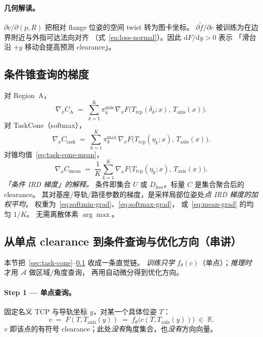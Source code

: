 \documentclass[UTF8,a4paper,11pt,fontset=fandol]{ctexart}
\newcommand{\R}{\mathbb{R}}
\newcommand{\Tcp}{T_{\mathrm{tcp}}}
\newcommand{\Taxis}{T_{\mathrm{axis}}}
\begin{document}
\paragraph{几何解读。}
\(\partial c/\partial(p,R)\) 把相对 flange 位姿的空间 twist 转为图卡坐标。
\(\partial\tilde f/\partial c\) 被训练为在边界附近与外指可达法向对齐
（式~\eqref{eq:loss-normal}）。因此 \(\mathrm{d}F/\mathrm{d}y>0\) 表示
「滑台沿 \(+y\) 移动会提高预测 clearance」。

\subsection{条件锥查询的梯度}
\label{sec:cond-grad}

对 Region~A，
\begin{equation}
\label{eq:grad-region}
  \nabla_{x} C_{\mathrm{A}}
  \;=\;
  \sum_{k=1}^{K}
  \pi_{k}^{\mathrm{min}}\,
  \nabla_{x} F\bigl(\Tcp(\delta_{k};x),\,\Taxis(x)\bigr).
\end{equation}
对 TaskCone（softmax），
\begin{equation}
\label{eq:grad-task}
  \nabla_{x} C_{\mathrm{task}}
  \;=\;
  \sum_{k=1}^{K}
  \pi_{k}^{\mathrm{max}}\,
  \nabla_{x} F\bigl(\Tcp(\eta_{k};x),\,\Taxis(x)\bigr).
\end{equation}
对锥均值~\eqref{eq:task-cone-mean}，
\begin{equation}
\label{eq:grad-mean}
  \nabla_{x} C_{\mathrm{mean}}
  \;=\;
  \frac{1}{K}\sum_{k=1}^{K}
  \nabla_{x} F\bigl(\Tcp(\eta_{k};x),\,\Taxis(x)\bigr).
\end{equation}
\emph{「条件 IRD 梯度」的解释。}
条件即集合 \(U\) 或 \(D_{\mathrm{free}}\)。标量 \(C\) 是集合聚合后的 clearance。
其对基座/导轨/路径参数的梯度，是采样局部位姿处\emph{点 IRD 梯度的加权平均}，
权重为~\eqref{eq:softmin-grad}、\eqref{eq:softmax-grad}，
或~\eqref{eq:mean-grad} 的均匀 \(1/K\)。
无需离散体素 \(\arg\max\)。

\subsection{从单点 clearance 到条件查询与优化方向（串讲）}
\label{sec:agg-to-grad}

本节把~\ref{sec:task-cone}--\ref{sec:cond-grad} 收成一条直觉链。
\emph{训练只学} \(f_{\theta}(c)\)（单点）；\emph{推理时}才用 \(\mathcal{A}\) 做区域/角度查询，
再用自动微分得到优化方向。

\paragraph{Step 1 --- 单点查询。}
固定名义 TCP 与导轨坐标 \(y\)，对某一个具体位姿 \(T\)：
\begin{equation}
\label{eq:point-clearance}
  v
  \;=\;
  F(T,\Taxis(y))
  \;=\;
  f_{\theta}\bigl(c(T,\Taxis(y))\bigr)
  \;\in\;
  \R.
\end{equation}
\(v\) 即该点的有符号 clearance；此处\emph{没有}角度集合，也\emph{没有}方向向量。
\end{document}
